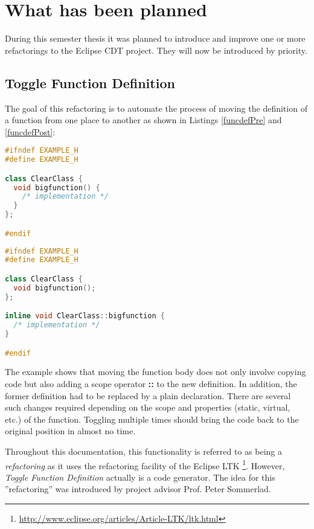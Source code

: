 \section{What has been planned}

During this semester thesis it was planned to introduce and improve one or more
refactorings to the Eclipse CDT project. They will now be introduced by 
priority.

\subsection{Toggle Function Definition}
The goal of this refactoring is to automate the process of moving the definition 
of a function from one place to another as shown in Listings
\ref{funcdefPre} and \ref{funcdefPost}:\newline

\begin{lstlisting}[caption={Initial situation: member function defined inside a
class},label={funcdefPre},language=C++]
#ifndef EXAMPLE_H
#define EXAMPLE_H

class ClearClass {
  void bigfunction() {
    /* implementation */
  }
};

#endif
\end{lstlisting}

\begin{lstlisting}[caption={Separated definition after toggling},
label={funcdefPost},language=C++]
#ifndef EXAMPLE_H
#define EXAMPLE_H

class ClearClass {
  void bigfunction();
};

inline void ClearClass::bigfunction {
  /* implementation */
}

#endif
\end{lstlisting}

The example shows that moving the function body does not only involve copying 
code but also adding a scope operator \textbf{::} to the new definition. In
addition, the 
former definition had to be replaced by a plain declaration. There are several 
such changes required depending on the scope and properties (static, virtual, 
etc.) of the function. Toggling multiple times should bring the code back to the 
original position in almost no time. 

Throughout this documentation, this functionality is referred to as being a 
\textit{refactoring} as it uses the refactoring facility of the Eclipse LTK
\footnote{\url{http://www.eclipse.org/articles/Article-LTK/ltk.html}}. However, 
\textit{Toggle Function Definition} actually is a code generator. The idea for 
this ''refactoring'' was introduced by project advisor Prof. Peter Sommerlad.

